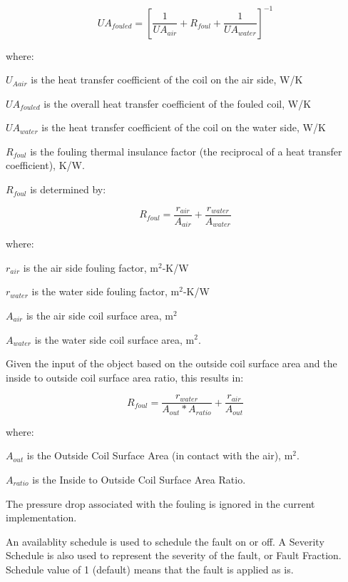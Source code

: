 \begin{equation}
    UA_{fouled} = [\frac{1}{UA_{air}} + R_{foul} + \frac{1}{UA_{water}}]^{-1}
\end{equation}

where:

\(U_{Aair}\) is the heat transfer coefficient of the coil on the air side, W/K

\(UA_{fouled}\) is the overall heat transfer coefficient of the fouled coil, W/K

\(UA_{water}\) is the heat transfer coefficient of the coil on the water side, W/K

\(R_{foul}\) is the fouling thermal insulance factor (the reciprocal of a heat transfer coefficient), K/W.

\(R_{foul}\) is determined by:

\begin{equation}
    R_{foul} = \frac{r_{air}}{A_{air}} + \frac{r_{water}}{A_{water}}
\end{equation}

where:

\(r_{air}\) is the air side fouling factor, m\(^{2}\)-K/W

\(r_{water}\) is the water side fouling factor, m\(^{2}\)-K/W

\(A_{air}\) is the air side coil surface area, m\(^{2}\)

\(A_{water}\) is the water side coil surface area, m\(^{2}\).

Given the input of the object based on the outside coil surface area and the inside to outside coil surface area ratio, this results in:

\begin{equation}
    R_{foul} = \frac{r_{water}}{A_{out}*A_{ratio}} + \frac{r_{air}}{A_{out}}
\end{equation}

where:

\(A_{out}\) is the Outside Coil Surface Area (in contact with the air), m\(^{2}\).

\(A_{ratio}\) is the Inside to Outside Coil Surface Area Ratio.

The pressure drop associated with the fouling is ignored in the current implementation.

An availablity schedule is used to schedule the fault on or off.
A Severity Schedule is also used to represent the severity of the fault, or Fault Fraction. Schedule value of 1 (default) means that the fault is applied as is.

